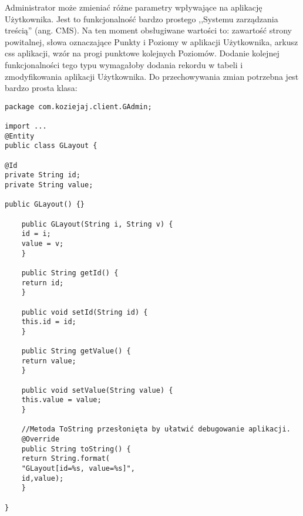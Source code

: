 \documentclass[a4paper,12pt,twoside,openany]{report}
\begin{document}
Administrator może zmieniać różne parametry wpływające na aplikację Użytkownika. Jest to funkcjonalność bardzo prostego ,,Systemu zarządzania treścią'' (ang. CMS). Na ten moment obsługiwane wartości to: zawartość strony powitalnej, słowa oznaczające Punkty i Poziomy w aplikacji Użytkownika, arkusz css aplikacji, wzór na progi punktowe kolejnych Poziomów. Dodanie kolejnej funkcjonalności tego typu wymagałoby dodania rekordu w tabeli i zmodyfikowania aplikacji Użytkownika. Do przechowywania zmian potrzebna jest bardzo prosta klasa: 
\begin{lstlisting}
package com.koziejaj.client.GAdmin;

import ...
@Entity
public class GLayout {

@Id
private String id;
private String value;

public GLayout() {}

	public GLayout(String i, String v) {
	id = i;
	value = v;
	}

	public String getId() {
	return id;
	}

	public void setId(String id) {
	this.id = id;
	}

	public String getValue() {
	return value;
	}

	public void setValue(String value) {
	this.value = value;
	}
	
	//Metoda ToString przesłonięta by ułatwić debugowanie aplikacji.
	@Override
	public String toString() {
	return String.format(
	"GLayout[id=%s, value=%s]",
	id,value);
	}

}

\end{lstlisting}
\end{document}
